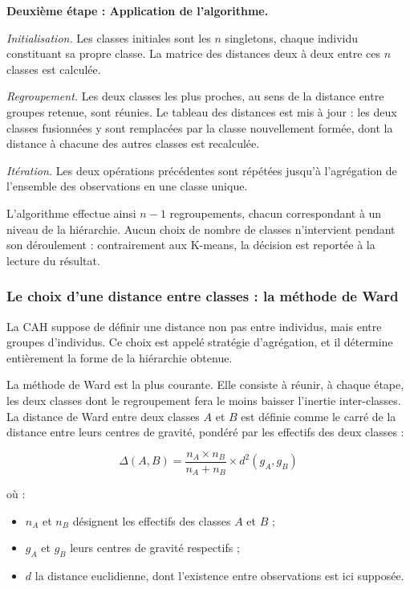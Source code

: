 \textbf{Deuxième étape : Application de l'algorithme.}

\textit{Initialisation.} Les classes initiales sont les $n$ singletons, chaque individu constituant sa propre classe. La matrice des distances deux à deux entre ces $n$ classes est calculée.

\textit{Regroupement.} Les deux classes les plus proches, au sens de la distance entre groupes retenue, sont réunies. Le tableau des distances est mis à jour : les deux classes fusionnées y sont remplacées par la classe nouvellement formée, dont la distance à chacune des autres classes est recalculée.

\textit{Itération.} Les deux opérations précédentes sont répétées jusqu'à l'agrégation de l'ensemble des observations en une classe unique.

L'algorithme effectue ainsi $n - 1$ regroupements, chacun correspondant à un niveau de la hiérarchie. Aucun choix de nombre de classes n'intervient pendant son déroulement : contrairement aux K-means, la décision est reportée à la lecture du résultat.

\subsubsection*{Le choix d'une distance entre classes : la méthode de Ward}

La CAH suppose de définir une distance non pas entre individus, mais entre groupes d'individus. Ce choix est appelé stratégie d'agrégation, et il détermine entièrement la forme de la hiérarchie obtenue.

La méthode de Ward est la plus courante. Elle consiste à réunir, à chaque étape, les deux classes dont le regroupement fera le moins baisser l'inertie inter-classes. La distance de Ward entre deux classes $A$ et $B$ est définie comme le carré de la distance entre leurs centres de gravité, pondéré par les effectifs des deux classes :

\begin{equation}
    \Delta(A, B) = \frac{n_A \times n_B}{n_A + n_B} \times d^2(g_A, g_B)
\end{equation}

où :

\begin{itemize}[label=$\bullet$]
    \item $n_A$ et $n_B$ désignent les effectifs des classes $A$ et $B$ ;
    \item $g_A$ et $g_B$ leurs centres de gravité respectifs ;
    \item $d$ la distance euclidienne, dont l'existence entre observations est ici supposée.
\end{itemize}

